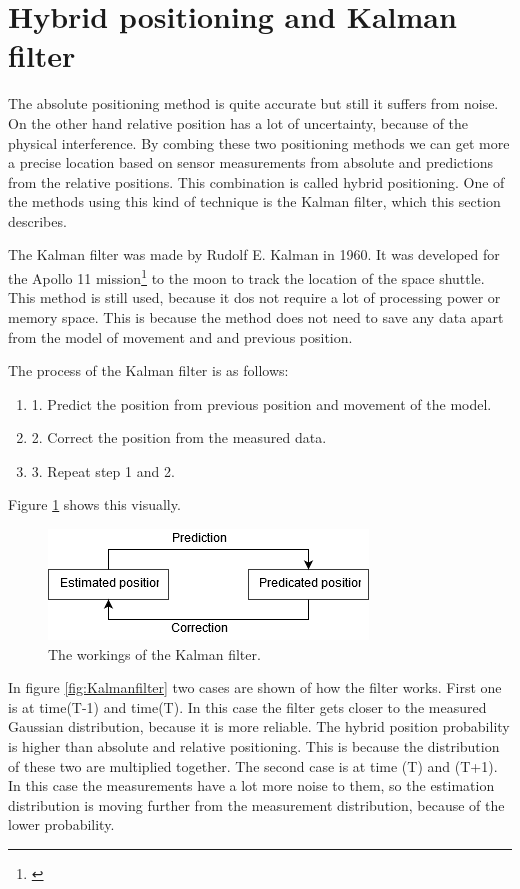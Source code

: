 \section{Hybrid positioning and Kalman filter}

The absolute positioning method is quite accurate but still it suffers from noise. On the other hand relative position has a lot of uncertainty, because of the physical interference. By combing these two positioning methods we can get more a precise location based on sensor measurements from absolute and predictions from the relative positions. This combination is called hybrid positioning. One of the methods using this kind of technique is the Kalman filter, which this section describes.

The Kalman filter was made by Rudolf E. Kalman in 1960. It was developed for the Apollo 11 mission\footnote{\cite{Grewal2010}} to the moon to track the location of the space shuttle. This method is still used, because it dos not require a lot of processing power or memory space. This is because the method does not need to save any data apart from the model of movement and and previous position.

The process of the Kalman filter is as follows:

\begin{enumerate}
	\item 1. Predict the position from previous position and movement of the model.
	\item 2. Correct the position from the measured data.
	\item 3. Repeat step 1 and 2.
\end{enumerate}

Figure \ref{fig:KalmanfilterRotation} shows this visually.

\begin{figure}[H]
	\centering
	\includegraphics[width=0.4\linewidth]{positioning/positioning/KalmanFilterProcess}
	\caption{The workings of the Kalman filter.}
	\label{fig:KalmanfilterRotation}
\end{figure}

In figure \ref{fig:Kalmanfilter} two cases are shown of how the filter works. First one is at time(T-1) and time(T). In this case the filter gets closer to the measured Gaussian distribution, because it is more reliable. The hybrid position probability is higher than absolute and relative positioning. This is because the distribution of these two are multiplied together. The second case is at time (T) and (T+1). In this case the measurements have a lot more noise to them, so the estimation distribution is moving further from the measurement distribution, because of the lower probability. 

